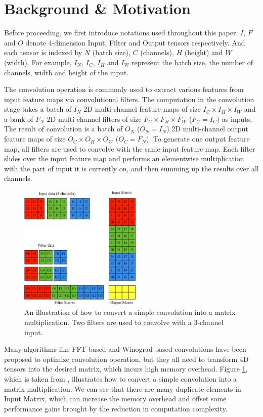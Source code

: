 
\section{Background \& Motivation}
Before proceeding, we first introduce notations used throughout this paper. $I$, $F$ and $O$ denote 4-dimension Input, Filter and Output
tensors respectively. And each tensor is indexed by $N$ (batch size), $C$ (channels), $H$ (height) and $W$ (width). For example, $I_N$,
$I_C$, $I_H$ and $I_W$ represent the batch size, the number of channels, width and height of the input.

The convolution operation is commonly used to extract various features from input feature maps via convolutional filters. The computation
in the convolution stage takes a batch of $I_N$ 2D multi-channel feature maps of size $I_C \times I_H \times I_W$ and a bank of $F_N$ 2D
multi-channel filters of size $F_C \times F_H \times F_W$ ($F_C = I_C$) as inputs. The result of convolution is a batch of $O_N$
($O_N=I_N$) 2D multi-channel output feature maps of size $O_C \times O_H \times O_W$ ($O_C=F_N$). To generate one output feature map, all
filters are used to convolve with the same input feature map. Each filter slides over the input feature map and performs an elementwise
multiplication with the part of input it is currently on, and then summing up the results over all channels.

\begin{figure}
\centering
  \includegraphics[width=0.75\columnwidth,height=6cm]{./figure/convlowering.eps}
  \caption{An illustration of how to convert a simple convolution into a matrix multiplication. Two filters are used to convolve with a 3-channel input.}
  \label{fig:convlowering}
\end{figure}

Many algorithms like FFT-based and Winograd-based convolutions have been proposed to optimize convolution operation, but they all need to
transform 4D tensors into the desired matrix, which incurs high memory overhead. Figure \ref{fig:convlowering}, which is taken from
\cite{ChetlurWVCTCS14}, illustrates how to convert a simple convolution into a matrix multiplication. We can see that there are many
duplicate elements in Input Matrix, which can increase the memory overhead and offset some performance gains brought by the reduction in
computation complexity.

